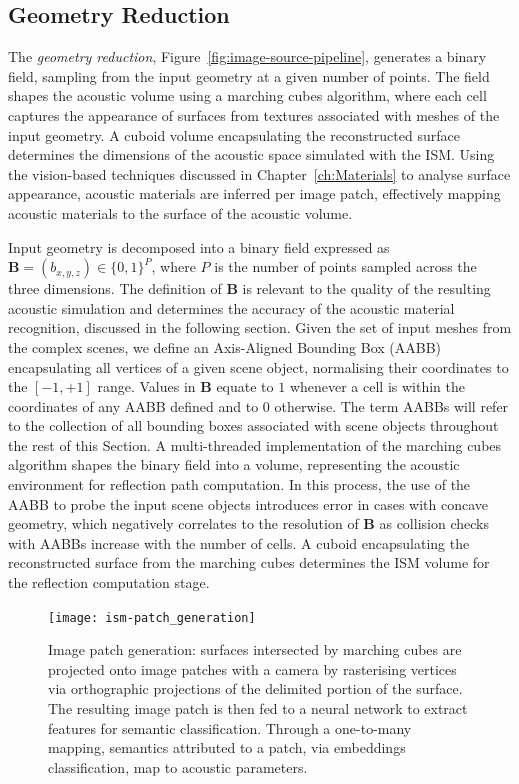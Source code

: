\subsection{Geometry Reduction}
The \emph{geometry reduction}, Figure~\ref{fig:image-source-pipeline}, generates a binary field, sampling from the input geometry at a given number of points. The field shapes the acoustic volume using a marching cubes algorithm, where each cell captures the appearance of surfaces from textures associated with meshes of the input geometry. A cuboid volume encapsulating the reconstructed surface determines the dimensions of the acoustic space simulated with the ISM. Using the vision-based techniques discussed in Chapter~\ref{ch:Materials} to analyse surface appearance, acoustic materials are inferred per image patch, effectively mapping acoustic materials to the surface of the acoustic volume.\par
Input geometry is decomposed into a binary field expressed as $\mathbf{B} = (b_{x,y,z}) \in \{ 0, 1 \}^{P}$, where $P$ is the number of points sampled across the three dimensions. The definition of $\mathbf{B}$ is relevant to the quality of the resulting acoustic simulation and determines the accuracy of the acoustic material recognition, discussed in the following section. Given the set of input meshes from the complex scenes, we define an Axis-Aligned Bounding Box (AABB) encapsulating all vertices of a given scene object, normalising their coordinates to the $[-1, +1]$ range. Values in $\mathbf{B}$ equate to $1$ whenever a cell is within the coordinates of any AABB defined and to $0$ otherwise. The term AABBs will refer to the collection of all bounding boxes associated with scene objects throughout the rest of this Section. A multi-threaded implementation of the marching cubes algorithm \citep{bourke1994polygonising, lengyel2019foundations} shapes the binary field into a volume, representing the acoustic environment for reflection path computation. In this process, the use of the AABB to probe the input scene objects introduces error in cases with concave geometry, which negatively correlates to the resolution of $\mathbf{B}$ as collision checks with AABBs increase with the number of cells. A cuboid encapsulating the reconstructed surface from the marching cubes determines the ISM volume for the reflection computation stage.\par

\begin{figure}[htb]
    \centering 
    \texttt{[image: ism-patch\_generation]}
    \caption{Image patch generation: surfaces intersected by marching cubes are projected onto image patches with a camera by rasterising vertices via orthographic projections of the delimited portion of the surface. The resulting image patch is then fed to a neural network to extract features for semantic classification. Through a one-to-many mapping, semantics attributed to a patch, via embeddings classification, map to acoustic parameters.}
\label{fig:ism-patch_generation}
\end{figure}

